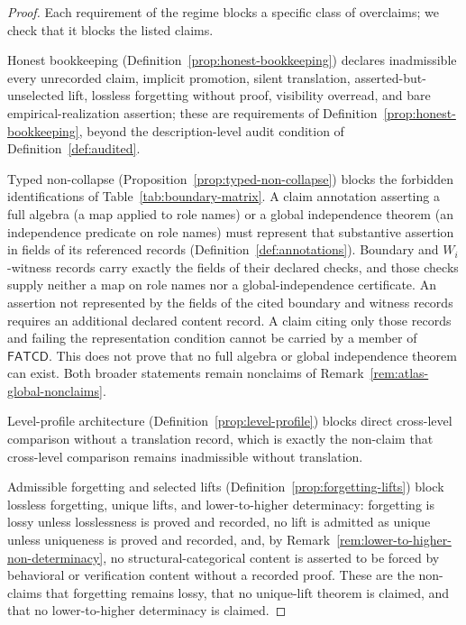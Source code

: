 \documentclass[11pt]{article}
\theoremstyle{definition}
\newcommand{\FATCD}{\ensuremath{\mathsf{FATCD}}}
\begin{document}
\begin{proof}
Each requirement of the regime blocks a specific class of overclaims;
we check that it blocks the listed claims.

Honest bookkeeping (Definition~\ref{prop:honest-bookkeeping}) declares
inadmissible every unrecorded claim, implicit promotion, silent
translation, asserted-but-unselected lift, lossless forgetting without
proof, visibility overread, and bare empirical-realization assertion;
these are requirements of Definition~\ref{prop:honest-bookkeeping},
beyond the description-level audit condition of Definition~\ref{def:audited}.

Typed non-collapse (Proposition~\ref{prop:typed-non-collapse}) blocks the
forbidden identifications of Table~\ref{tab:boundary-matrix}. A claim
annotation asserting a full algebra (a map applied to role names) or a global
independence theorem (an independence predicate on role names) must represent
that substantive assertion in fields of its referenced records
(Definition~\ref{def:annotations}). Boundary and \(W_i\)-witness records carry
exactly the fields of their declared checks, and those checks supply neither a
map on role names nor a global-independence certificate. An assertion not represented by the fields of the cited boundary and witness
records requires an additional declared content record. A claim citing only
those records and failing the representation condition cannot be carried by a member of
\FATCD{}. This does not prove that no full
algebra or global independence theorem can exist. Both broader statements remain nonclaims of
Remark~\ref{rem:atlas-global-nonclaims}.

Level-profile architecture (Definition~\ref{prop:level-profile}) blocks
direct cross-level comparison without a translation record, which is
exactly the non-claim that cross-level comparison remains inadmissible
without translation.

Admissible forgetting and selected lifts
(Definition~\ref{prop:forgetting-lifts}) block lossless forgetting,
unique lifts, and lower-to-higher determinacy: forgetting is lossy
unless losslessness is proved and recorded, no lift is admitted as
unique unless uniqueness is proved and recorded, and, by
Remark~\ref{rem:lower-to-higher-non-determinacy}, no structural-categorical
content is asserted to be forced by behavioral or verification content without
a recorded proof. These are
the non-claims that forgetting remains lossy, that no unique-lift
theorem is claimed, and that no lower-to-higher determinacy is claimed.


\end{proof}
\end{document}

